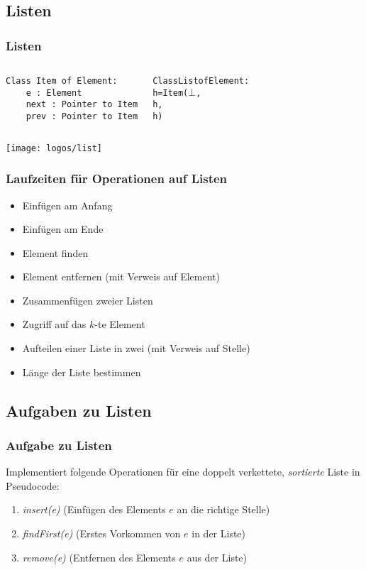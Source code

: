 \documentclass[18pt]{beamer}
\begin{document}
\subsection{Listen}
\begin{frame}[fragile]
	\frametitle{Listen}
	\begin{columns}[t]
\begin{verbatim}
Class Item of Element:
    e : Element
    next : Pointer to Item
    prev : Pointer to Item
\end{verbatim}
\begin{alltt}
Class List of Element:
    h = Item(\(\bot\),
      h,
      h)
\end{alltt}
	\end{columns}
	\texttt{[image: logos/list]}
\end{frame}

\begin{frame}
	\frametitle{Laufzeiten für Operationen auf Listen}
	\begin{itemize}
		\item Einfügen am Anfang \only<2->{\textbf{$\mathcal{O}(1)$}}
		\item Einfügen am Ende \only<3->{\textbf{$\mathcal{O}(1)$}}
		\item Element finden \only<4->{\textbf{$\mathcal{O}(n)$}}
		\item Element entfernen (mit Verweis auf Element) \only<5->{\textbf{$\mathcal{O}(1)$}}
		\item Zusammenfügen zweier Listen \only<6->{\textbf{$\mathcal{O}(1)$}}
		\item Zugriff auf das $k$-te Element \only<7->{\textbf{$\mathcal{O}(n)$}}
		\item Aufteilen einer Liste in zwei (mit Verweis auf Stelle) \only<8->{\textbf{$\mathcal{O}(1)$}}
		\item Länge der Liste bestimmen \only<9->{\textbf{$\mathcal{O}(n)$}}
	\end{itemize}
\end{frame}

\subsection{Aufgaben zu Listen}
\begin{frame}
	\frametitle{Aufgabe zu Listen}
	Implementiert folgende Operationen für eine doppelt verkettete, \emph{sortierte} Liste in Pseudocode:

	\begin{enumerate}
		\item \emph{insert(e)} (Einfügen des Elements $e$ an die richtige Stelle)
		\item \emph{findFirst(e)} (Erstes Vorkommen von $e$ in der Liste)
		\item \emph{remove(e)} (Entfernen des Elements $e$ aus der Liste)
	\end{enumerate}
\end{frame}
\end{document}

